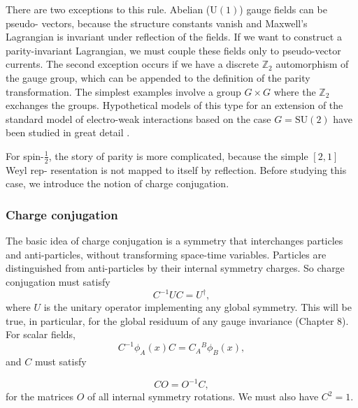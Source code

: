 There are two exceptions to this rule. Abelian ($\mathrm{U}(1)$) gauge fields can be pseudo-
vectors, because the structure constants vanish and Maxwell’s Lagrangian is invariant
under reflection of the fields. If we want to construct a parity-invariant Lagrangian, we
must couple these fields only to pseudo-vector currents. The second exception occurs if
we have a discrete $\mathbb Z_2$ automorphism of the gauge group, which can be appended to the
definition of the parity transformation. The simplest examples involve a group $G\times G$
where the $\mathbb Z_2$ exchanges the groups. Hypothetical models of this type for an extension
of the standard model of electro-weak interactions based on the case $G=\mathrm{SU}(2)$ have
been studied in great detail \cite{banks-ref-26,banks-ref-27,banks-ref-28,banks-ref-29}.

For spin-$\frac12$, the story of parity is more complicated, because the simple $[2,1]$ Weyl rep-
resentation is not mapped to itself by reflection. Before studying this case, we introduce
the notion of charge conjugation.

\subsubsection{Charge conjugation}

The basic idea of charge conjugation is a symmetry that interchanges particles and
anti-particles, without transforming space-time variables. Particles are distinguished
from anti-particles by their internal symmetry charges. So charge conjugation must
satisfy
\begin{equation*}
  C^{-1}UC=U^\dagger,
\end{equation*}
where $U$ is the unitary operator implementing any global symmetry. This will be true,
in particular, for the global residuum of any gauge invariance (Chapter 8). For scalar
fields,
\begin{equation*}
  C^{-1}\phi_A(x)C=C_A{}^B\phi_B(x),
\end{equation*}
and $C$ must satisfy

\begin{equation}
  CO=O^{-1}C,
  \label{eq:5.5}
\end{equation}
for the matrices $O$ of all internal symmetry rotations. We must also have $C^2=1$.

